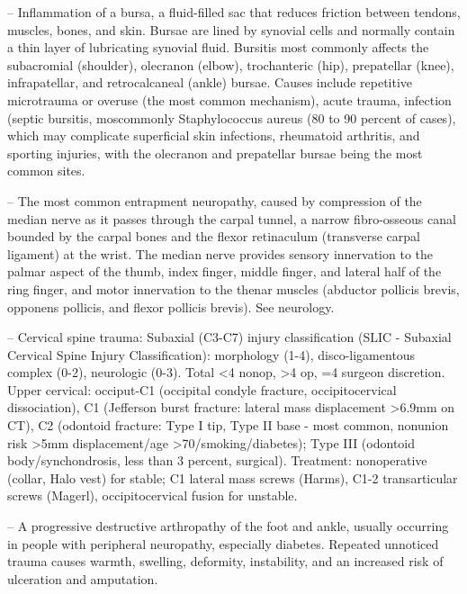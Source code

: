 -- Inflammation of a bursa, a fluid-filled sac that reduces friction between tendons, muscles, bones, and skin. Bursae are lined by synovial cells and normally contain a thin layer of lubricating synovial fluid. Bursitis most commonly affects the subacromial (shoulder), olecranon (elbow), trochanteric (hip), prepatellar (knee), infrapatellar, and retrocalcaneal (ankle) bursae. Causes include repetitive microtrauma or overuse (the most common mechanism), acute trauma, infection (septic bursitis, moscommonly Staphylococcus aureus (80 to 90 percent of cases), which may complicate superficial skin infections, rheumatoid arthritis, and sporting injuries, with the olecranon and prepatellar bursae being the most common sites.

-- The most common entrapment neuropathy, caused by compression of the median nerve as it passes through the carpal tunnel, a narrow fibro-osseous canal bounded by the carpal bones and the flexor retinaculum (transverse carpal ligament) at the wrist. The median nerve provides sensory innervation to the palmar aspect of the thumb, index finger, middle finger, and lateral half of the ring finger, and motor innervation to the thenar muscles (abductor pollicis brevis, opponens pollicis, and flexor pollicis brevis). See neurology.

-- Cervical spine trauma: Subaxial (C3-C7) injury classification (SLIC - Subaxial Cervical Spine Injury Classification): morphology (1-4), disco-ligamentous complex (0-2), neurologic (0-3). Total <4 nonop, >4 op, =4 surgeon discretion. Upper cervical: occiput-C1 (occipital condyle fracture, occipitocervical dissociation), C1 (Jefferson burst fracture: lateral mass displacement >6.9mm on CT), C2 (odontoid fracture: Type I tip, Type II base - most common, nonunion risk >5mm displacement/age >70/smoking/diabetes); Type III (odontoid body/synchondrosis, less than 3 percent, surgical). Treatment: nonoperative (collar, Halo vest) for stable; C1 lateral mass screws (Harms), C1-2 transarticular screws (Magerl), occipitocervical fusion for unstable.

-- A progressive destructive arthropathy of the foot and ankle, usually occurring in people with peripheral neuropathy, especially diabetes. Repeated unnoticed trauma causes warmth, swelling, deformity, instability, and an increased risk of ulceration and amputation.

